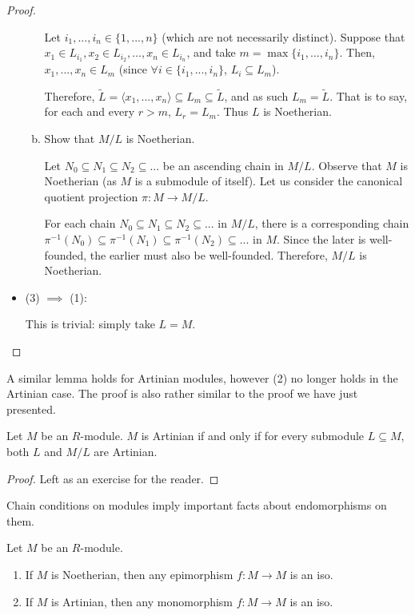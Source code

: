 \documentclass[12pt, a4paper, titlepage]{report}
\newcommand\dangle[1]{\langle {#1} \rangle}
\begin{document}
\begin{proof}
\begin{itemize}
\begin{enumerate}[(a)]
      Let $i_1, ..., i_n \in \{1, ..., n\}$ (which are not necessarily distinct). Suppose that
      $x_1 \in L_{i_1}, x_2 \in L_{i_2}, ..., x_n \in L_{i_n}$, and take $m = \max \{i_1, ..., i_n\}$.
      Then, $x_1, ..., x_n \in L_m$ (since $\forall i \in \{i_1, ..., i_n\}$, $L_i \subseteq L_m$).
      
      Therefore, $\widetilde{L} = \dangle{x_1, ..., x_n} \subseteq L_m \subseteq \widetilde{L}$, and
      as such $L_m = \widetilde{L}$. That is to say, for each and every $r > m$, $L_r = L_m$.
      Thus $L$ is Noetherian.
      
    \item Show that $M/L$ is Noetherian.
      
      Let $N_0 \subseteq N_1 \subseteq N_2 \subseteq ...$ be an ascending chain in $M/L$. Observe that $M$ is Noetherian
      (as $M$ is a submodule of itself). Let us consider the canonical quotient projection $\pi : M \to M/L$.

      For each chain $N_0 \subseteq N_1 \subseteq N_2 \subseteq ...$ in $M/L$, there is a corresponding chain
      $\pi^{-1}(N_0) \subseteq \pi^{-1}(N_1) \subseteq \pi^{-1}(N_2) \subseteq ...$ in $M$. Since the later is well-founded,
      the earlier must also be well-founded. Therefore, $M/L$ is Noetherian.
    \end{enumerate}

  \item (3) $\implies$ (1):
    
    This is trivial: simply take $L = M$.
  \end{itemize}
\end{proof}

A similar lemma holds for Artinian modules, however (2) no longer holds in the Artinian case. The proof is also rather similar to
the proof we have just presented.

\begin{lem}
  Let $M$ be an $R$-module. $M$ is Artinian if and only if for every submodule $L \subseteq M$, both $L$ and $M/L$ are Artinian.
\end{lem}

\begin{proof}Left as an exercise for the reader.\end{proof}

Chain conditions on modules imply important facts about endomorphisms on them.

\begin{lem}
  Let $M$ be an $R$-module.
  \begin{enumerate}[(1)]
  \item If $M$ is Noetherian, then any epimorphism $f : M \to M$ is an iso.
  \item If $M$ is Artinian, then any monomorphism $f : M \to M$ is an iso.
  \end{enumerate}
\end{lem}
\end{document}
